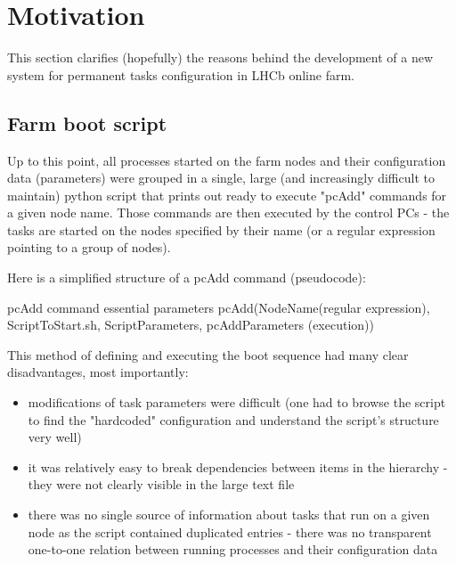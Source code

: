 \documentclass{customization}
\begin{document}

\newpage
\section{Motivation}
\hspace{0.6cm}

This section clarifies (hopefully) the reasons behind the development of a new system for permanent tasks configuration in LHCb online farm.


\subsection{Farm boot script}
\hspace{0.6cm}

Up to this point, all processes started on the farm nodes and their configuration data (parameters) were grouped in a single, large (and increasingly difficult to maintain) python script that prints out ready to execute "pcAdd" commands for a given node name. Those commands are then executed by the control PCs - the tasks are started on the nodes specified by their name (or a regular expression pointing to a group of nodes).
\newline

\noindent
Here is a simplified structure of a pcAdd command (pseudocode):
\newline

\begin{sexylisting}[colback=white]{pcAdd command essential parameters}
pcAdd(NodeName(regular expression), ScriptToStart.sh,
      ScriptParameters, pcAddParameters (execution))
\end{sexylisting}

\noindent
This method of defining and executing the boot sequence had many clear disadvantages, most importantly:

\begin{itemize}
    \item modifications of task parameters were difficult (one had to browse the script to find the "hardcoded" configuration and understand the script's structure very well)
    \item it was relatively easy to break dependencies between items in the hierarchy - they were not clearly visible in the large text file
    \item there was no single source of information about tasks that run on a given node as the script contained duplicated entries - there was no transparent one-to-one relation between running processes and their configuration data
\end{itemize}
\end{document}

